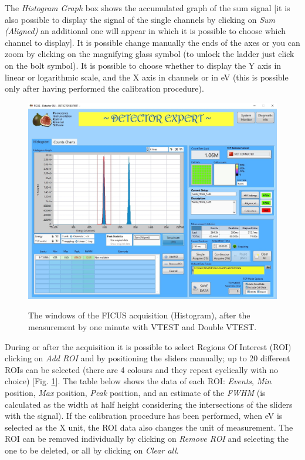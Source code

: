 \documentclass[a4paper,12pt,oneside,pdflatex,italian,final,twocolumn]{article}
\begin{document}
The \textit{Histogram Graph} box shows the accumulated graph of the sum signal [it is also possible to display the signal of the single channels by clicking on \textit{Sum (Aligned)} an additional one will appear in which it is possible to choose which channel to display]. It is possible change manually the ends of the axes or you can zoom by clicking on the magnifying glass symbol (to unlock the ladder just click on the bolt symbol).
It is possible to choose whether to display the Y axis in linear or logarithmic scale, and the X axis in channels or in eV (this is possible only after having performed the calibration procedure).

\begin{figure}[h!]
\centering
{\includegraphics[width=.95\textwidth]{Capture31.jpg}} \quad
\caption{The windows of the FICUS acquisition (Histogram), after the measurement by one minute with VTEST and Double VTEST.}\label{fig:fig24}
\end{figure}

During or after the acquisition it is possible to select Regions Of Interest (ROI) clicking on \textit{Add ROI} and by positioning the sliders manually; up to 20 different ROIs can be selected (there are 4 colours and they repeat cyclically with no choice) [Fig. \ref{fig:fig24}]. 
The table below shows the data of each ROI: \textit{Events}, \textit{Min} position, \textit{Max} position, \textit{Peak} position, and an estimate of the \textit{FWHM} (is calculated as the width at half height considering the intersections of the sliders with the signal). 
If the calibration procedure has been performed, when eV is selected as the X unit, the ROI data also changes the unit of measurement.
The ROI can be removed individually by clicking on \textit{Remove ROI} and selecting the one to be deleted, or all by clicking on \textit{Clear all}.
\end{document}

